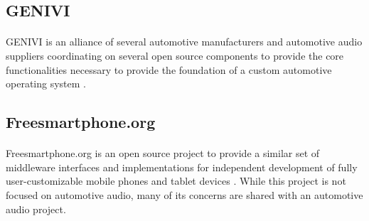 \subsection{GENIVI}

\paragraph{}
GENIVI is an alliance of several automotive manufacturers and automotive audio suppliers coordinating on several open source components to provide the core functionalities necessary to provide the foundation of a custom automotive operating system \cite{genivi-about}.

\subsection{Freesmartphone.org}

\paragraph{}
Freesmartphone.org is an open source project to provide a similar set of middleware interfaces and implementations for independent development of fully user-customizable mobile phones and tablet devices \cite{fso-home}.
While this project is not focused on automotive audio, many of its concerns are shared with an automotive audio project.
